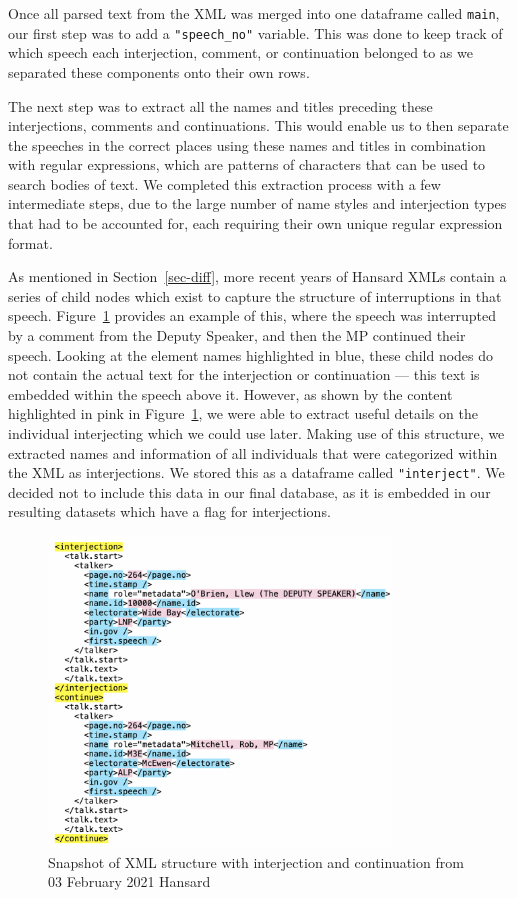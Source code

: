 \documentclass[
  letterpaper,
  DIV=11,
  numbers=noendperiod]{scrartcl}
\begin{document}
Once all parsed text from the XML was merged into one dataframe called
\texttt{main}, our first step was to add a \texttt{"speech\_no"}
variable. This was done to keep track of which speech each interjection,
comment, or continuation belonged to as we separated these components
onto their own rows.

The next step was to extract all the names and titles preceding these
interjections, comments and continuations. This would enable us to then
separate the speeches in the correct places using these names and titles
in combination with regular expressions, which are patterns of
characters that can be used to search bodies of text. We completed this
extraction process with a few intermediate steps, due to the large
number of name styles and interjection types that had to be accounted
for, each requiring their own unique regular expression format.

As mentioned in Section~\ref{sec-diff}, more recent years of Hansard
XMLs contain a series of child nodes which exist to capture the
structure of interruptions in that speech. Figure~\ref{fig-xml3}
provides an example of this, where the speech was interrupted by a
comment from the Deputy Speaker, and then the MP continued their speech.
Looking at the element names highlighted in blue, these child nodes do
not contain the actual text for the interjection or continuation ---
this text is embedded within the speech above it. However, as shown by
the content highlighted in pink in Figure~\ref{fig-xml3}, we were able
to extract useful details on the individual interjecting which we could
use later. Making use of this structure, we extracted names and
information of all individuals that were categorized within the XML as
interjections. We stored this as a dataframe called
\texttt{"interject"}. We decided not to include this data in our final
database, as it is embedded in our resulting datasets which have a flag
for interjections.

\begin{figure}

{\centering \includegraphics[width=3.59375in,height=\textheight]{images/xml3.png}

}

\caption{\label{fig-xml3}Snapshot of XML structure with interjection and
continuation from 03 February 2021 Hansard}

\end{figure}
\end{document}
